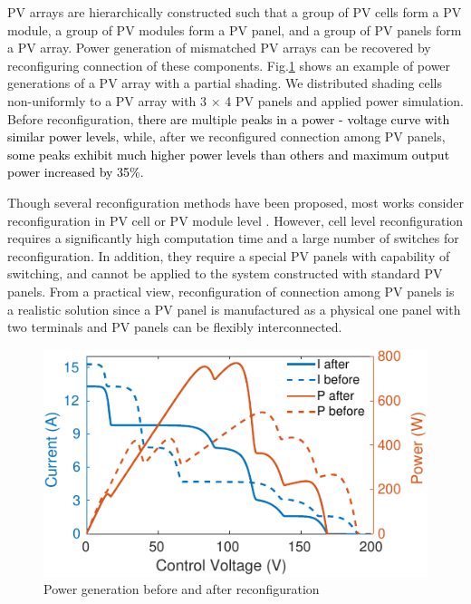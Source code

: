 \documentclass[conference]{pvsctran}
\newcommand{\michiko}{\textcolor{black}}
\newcommand{\zhao}{\textcolor{black}}
\begin{document}

PV arrays are hierarchically constructed such that a group of PV cells form a PV module, a group of PV modules form a PV panel, and a group of PV panels form a PV array. 
Power generation of mismatched PV arrays can be recovered by reconfiguring connection of these components. 
Fig.\ref{compare} shows an example of power generations of a PV array with a partial shading. 
We distributed shading cells non-uniformly to a PV array with 3 $\times$  4 PV panels and applied power simulation. 
Before reconfiguration, \michiko{there are} multiple \michiko{peaks in a power - voltage curve with similar power levels,} while, after we reconfigured connection among PV panels, 
\michiko{some peaks exhibit much higher power levels than others and }
\zhao{maximum output power increased by 35\%}.

Though several reconfiguration methods have been proposed, most works consider reconfiguration in PV cell or PV module level \cite{nguyen2008adaptive,wang2014architecture,storey2013improved,storey2014optimized,udenze2018reconfiguration}. 
However, cell level reconfiguration requires a significantly high computation time and a large number of switches for reconfiguration. 
In addition, they require a special PV panels with capability of switching, and cannot be applied to the system constructed with standard PV panels. 
From a practical view, reconfiguration of connection among PV panels is a realistic solution since a PV panel is manufactured as a physical one panel with two terminals and PV panels can be flexibly interconnected. 
\begin{figure}[t]
    \centering
    \includegraphics[width=0.8\linewidth]{../fig/compare.png}
    \caption{Power generation before and after reconfiguration}
    \label{compare}
\end{figure}
\end{document}
